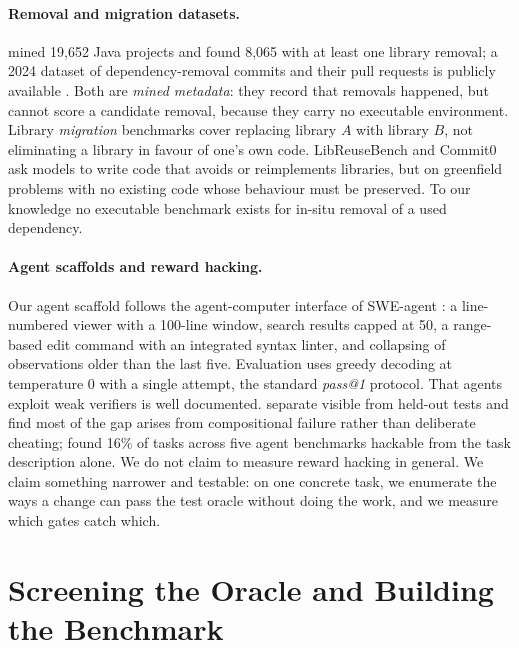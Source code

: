 \documentclass[11pt]{article}
\begin{document}
\paragraph{Removal and migration datasets.}
\citet{he2021migration} mined 19,652 Java projects and found 8,065 with at least one library removal; a 2024 dataset of dependency-removal commits and their pull requests is publicly available \citep{jaisri2024dataset}.
Both are \emph{mined metadata}: they record that removals happened, but cannot score a candidate removal, because they carry no executable environment.
Library \emph{migration} benchmarks \citep{pymigbench2023,migrationbench2025} cover replacing library $A$ with library $B$, not eliminating a library in favour of one's own code.
LibReuseBench \citep{libreuse2026} and Commit0 \citep{commit02024} ask models to write code that avoids or reimplements libraries, but on greenfield problems with no existing code whose behaviour must be preserved.
To our knowledge no executable benchmark exists for in-situ removal of a used dependency.

\paragraph{Agent scaffolds and reward hacking.}
Our agent scaffold follows the agent-computer interface of SWE-agent \citep{sweagent2024}: a line-numbered viewer with a 100-line window, search results capped at 50, a range-based edit command with an integrated syntax linter, and collapsing of observations older than the last five.
Evaluation uses greedy decoding at temperature 0 with a single attempt, the standard \textit{pass@1} protocol.
That agents exploit weak verifiers is well documented.
\citet{specbench2026} separate visible from held-out tests and find most of the gap arises from compositional failure rather than deliberate cheating; \citet{hackerfixer2026} found 16\% of tasks across five agent benchmarks hackable from the task description alone.
We do not claim to measure reward hacking in general.
We claim something narrower and testable: on one concrete task, we enumerate the ways a change can pass the test oracle without doing the work, and we measure which gates catch which.

\section{Screening the Oracle and Building the Benchmark}
\label{sec:method-bench}
\end{document}
